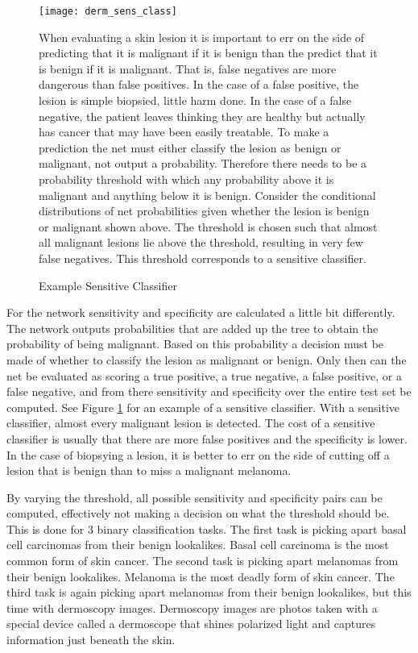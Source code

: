 \begin{figure}
\texttt{[image: derm\_sens\_class]}
\caption{Example Sensitive Classifier}
\vspace{12px}
When evaluating a skin lesion it is important to err on the side of predicting that it is malignant if it is benign than the predict that it is benign if it is malignant.  That is, false negatives are more dangerous than false positives.  In the case of a false positive, the lesion is simple biopsied, little harm done.  In the case of a false negative, the patient leaves thinking they are healthy but actually has cancer that may have been easily treatable.  To make a prediction the net must either classify the lesion as benign or malignant, not output a probability.  Therefore there needs to be a probability threshold with which any probability above it is malignant and anything below it is benign.  Consider the conditional distributions of net probabilities given whether the lesion is benign or malignant shown above.  The threshold is chosen such that almost all malignant lesions lie above the threshold, resulting in very few false negatives.  This threshold corresponds to a sensitive classifier.
\vspace{12px}
\label{fig:derm_sens_class}
\end{figure}

For the network sensitivity and specificity are calculated a little bit differently.  The network outputs probabilities that are added up the tree to obtain the probability of being malignant.  Based on this probability a decision must be made of whether to classify the lesion as malignant or benign.  Only then can the net be evaluated as scoring a true positive, a true negative, a false positive, or a false negative, and from there sensitivity and specificity over the entire test set be computed.  See Figure \ref{fig:derm_sens_class} for an example of a sensitive classifier.  With a sensitive classifier, almost every malignant lesion is detected.  The cost of a sensitive classifier is usually that there are more false positives and the specificity is lower.  In the case of biopsying a lesion, it is better to err on the side of cutting off a lesion that is benign than to miss a malignant melanoma.

By varying the threshold, all possible sensitivity and specificity pairs can be computed, effectively not making a decision on what the threshold should be.  This is done for 3 binary classification tasks.  The first task is picking apart basal cell carcinomas from their benign lookalikes.  Basal cell carcinoma is the most common form of skin cancer.  The second task is picking apart melanomas from their benign lookalikes.  Melanoma is the most deadly form of skin cancer.  The third task is again picking apart melanomas from their benign lookalikes, but this time with dermoscopy images.  Dermoscopy images are photos taken with a special device called a dermoscope that shines polarized light and captures information just beneath the skin.

